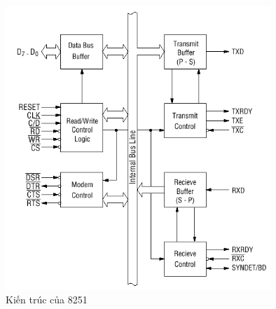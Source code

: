 \documentclass[../report.tex]{subfiles}
\begin{document}
\begin{figure}[H]
\centering
\includegraphics[width=10cm]{figures/8251-usart-architecture.png}
\caption{Kiến trúc của 8251}
\end{figure}
\end{document}
